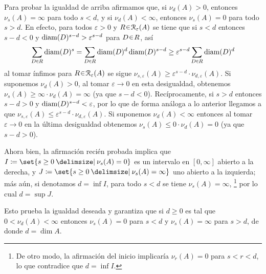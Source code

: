 \begin{sol}
\begin{enumerate}[label = (\roman*), leftmargin=1.5em]
Para probar la igualdad de arriba afirmamos que, si $\nu_d(A)>0$, entonces $\nu_s(A)=\infty$ para todo $s<d$, y si $\nu_d(A)<\infty$, entonces $\nu_s(A)=0$ para todo $s>d$. En efecto, para todos $\varepsilon>0$ y $R\en\mathcal{R}_\varepsilon(A)$ se tiene que si $s<d$ entonces $s-d < 0$ y $\operatorname{diam}(D)^{s-d} > \varepsilon^{s-d}$ para $D\en R$, así
\[
\sum_{D\en R} \diam(D)^s
= \sum_{D\en R} \diam(D)^d\diam(D)^{s-d}
\ge \varepsilon^{s-d}\sum_{D\en R} \diam(D)^d
\]
al tomar ínfimos para $R\en\mathcal{R}_\varepsilon(A)$ se sigue $\nu_{s,\varepsilon}(A) \geq \varepsilon^{s-d}\cdot\nu_{d,\varepsilon}(A)$. Si suponemos $\nu_d(A) >0$,
al tomar $\varepsilon \to 0$ en esta desigualdad, obtenemos $\nu_s(A) \ge \infty\cdot\nu_d(A) = \infty$ (ya que $s-d<0$). Recíprocamente, si $s>d$ entonces $s-d>0$ y $\operatorname{diam}(D)^{s-d} < \varepsilon$, por lo que de forma análoga a lo anterior llegamos a que $\nu_{s,\varepsilon}(A) \le \varepsilon^{s-d}\cdot\nu_{d,\varepsilon}(A)$. Si suponemos $\nu_d(A)<\infty$ entonces al tomar $\varepsilon\to0$ en la última desigualdad obtenemos $\nu_s(A) \le 0 \cdot \nu_d(A) = 0$ (ya que $s-d>0$).\par
Ahora bien, la afirmación recién probada implica que $I \coloneq \set{s\ge0 \given \nu_s(A)=0}$ es un intervalo en $[0,\infty]$ abierto a la derecha, y $J \coloneq \set{s\ge0 \given \nu_s(A)=\infty}$ uno abierto a la izquierda; más aún, si denotamos $d=\inf I$, para todo $s<d$ se tiene $\nu_s(A)= \infty$,%
\footnote{
De otro modo, la afirmación del inicio implicaría $\nu_r(A)=0$ para $s<r<d$, lo que contradice que $d=\inf I$.
}
por lo cual $d=\sup J$.\par
Esto prueba la igualdad deseada y garantiza que si $d\ge0$ es tal que $0< \nu_d(A) < \infty$ entonces $\nu_s(A) =0$ para $s<d$ y $\nu_s(A) = \infty $ para $s>d$, de donde $d = \dim A$.


\end{enumerate}
\end{sol}

